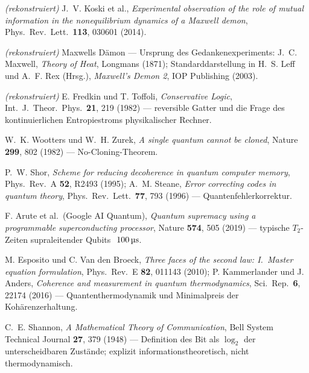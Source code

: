 \begin{description}[leftmargin=3.2em,style=sameline,itemsep=0.3em]
\item[{[B11]}] \emph{(rekonstruiert)} J.~V. Koski et al., \emph{Experimental
observation of the role of mutual information in the nonequilibrium dynamics of a
Maxwell demon}, Phys.\ Rev.\ Lett.\ \textbf{113}, 030601 (2014).

\item[{[B12]}] \emph{(rekonstruiert)} Maxwells Dämon --- Ursprung des
Gedankenexperiments: J.~C. Maxwell, \emph{Theory of Heat}, Longmans (1871);
Standarddarstellung in H.~S. Leff und A.~F. Rex (Hrsg.), \emph{Maxwell's Demon 2},
IOP Publishing (2003).

\item[{[B13]}] \emph{(rekonstruiert)} E. Fredkin und T. Toffoli, \emph{Conservative
Logic}, Int.\ J.\ Theor.\ Phys.\ \textbf{21}, 219 (1982) --- reversible Gatter und
die Frage des kontinuierlichen Entropiestroms physikalischer Rechner.

\item[{[B14]}] W.~K. Wootters und W.~H. Zurek, \emph{A single quantum cannot be
cloned}, Nature \textbf{299}, 802 (1982) --- No-Cloning-Theorem.

\item[{[B15]}] P.~W. Shor, \emph{Scheme for reducing decoherence in quantum
computer memory}, Phys.\ Rev.\ A \textbf{52}, R2493 (1995); A.~M. Steane,
\emph{Error correcting codes in quantum theory}, Phys.\ Rev.\ Lett.\ \textbf{77},
793 (1996) --- Quantenfehlerkorrektur.

\item[{[B16]}] F. Arute et al.\ (Google AI Quantum), \emph{Quantum supremacy using
a programmable superconducting processor}, Nature \textbf{574}, 505 (2019) ---
typische $T_2$-Zeiten supraleitender Qubits ${\sim}100\,\text{\textmu s}$.

\item[{[B17]}] M. Esposito und C. Van den Broeck, \emph{Three faces of the second
law: I.\ Master equation formulation}, Phys.\ Rev.\ E \textbf{82}, 011143 (2010);
P. Kammerlander und J. Anders, \emph{Coherence and measurement in quantum
thermodynamics}, Sci.\ Rep.\ \textbf{6}, 22174 (2016) --- Quantenthermodynamik und
Minimalpreis der Kohärenzerhaltung.

\item[{[B18]}] C.~E. Shannon, \emph{A Mathematical Theory of Communication}, Bell
System Technical Journal \textbf{27}, 379 (1948) --- Definition des Bit als
$\log_2$ der unterscheidbaren Zustände; explizit informationstheoretisch, nicht
thermodynamisch.


\end{description}
